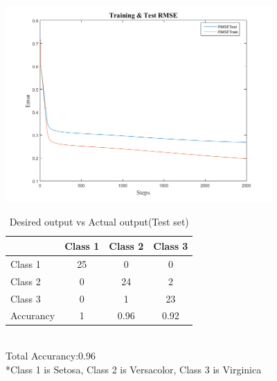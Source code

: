 \documentclass[epsfig]{article}
\def\spar{\vskip10pt}
\begin{document}
\centerline{\includegraphics[width=4in]{p42.png}} 
		

			
		\begin{table}[htbp]
			\centering
			\caption{Desired output vs Actual output(Test set)}
			\begin{tabular}{|l|ccc|}
				
				\hline
				
				\diagbox{Actual}{Desired} & Class 1 & Class 2 & Class 3 \\
				\hline
				Class 1&25 &0 &0\\
				Class 2&0 & 24&2\\
				Class 3&0 &1 &23\\
				\hline
				Accurancy &1&0.96 & 0.92\\
				\hline
			\end{tabular}\\
			Total Accurancy:0.96\\
			\spar
			*Class 1 is Setosa, Class 2 is Versacolor, Class 3 is Virginica
		\end{table}
\end{document}
